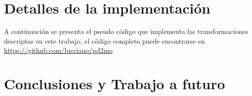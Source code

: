 \documentclass[a4paper,	11pt]{report}
\begin{document}
\chapter{Detalles de la implementación}
A continuación se presenta el pseudo código que implementa las transformaciones descriptas en este trabajo, el código completo puede encontrarse en \url{https://github.com/lucciano/pd2mo}

\chapter{Conclusiones y Trabajo a futuro}

\nocite{*}



\end{document}
